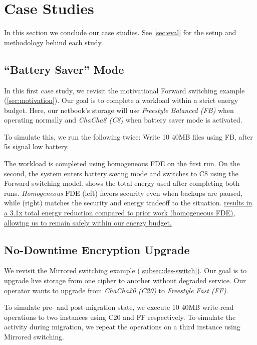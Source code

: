 \section{Case Studies}\label{sec:usecases}

In this section we conclude our case studies. See \cref{sec:eval} for the setup
and methodology behind each study.


\subsection{``Battery Saver'' Mode}\label{subsec:usecase-battery}

In this first case study, we revisit the motivational Forward switching example
(\cref{sec:motivation}). Our goal is to complete a workload within a strict
energy budget. Here, our netbook's storage will use {\em Freestyle Balanced
(FB)} when operating normally and {\em ChaCha8 (C8)} when battery saver mode is
activated.



To simulate this, we run the following twice: Write 10 40MB files using FB,
after 5s signal low battery.

The workload is completed using homogeneous FDE on the first run. On the second,
the system enters battery saving mode and \sys switches to C8 using the Forward
switching model.   shows the total energy used after
completing both runs. {\em Homogeneous} FDE (left) favors security even when
backups are paused, while \sys (right) matches the security and energy tradeoff
to the situation. \uline{\sys results in a 3.1x total energy reduction compared
to prior work (homogeneous FDE), allowing us to remain safely within our energy
budget.}


\subsection{No-Downtime Encryption Upgrade}\label{subsec:usecase-upgrade}

We revisit the Mirrored switching example (\cref{subsec:des-switch}). Our goal
is to upgrade live storage from one cipher to another without degraded service.
Our operator wants to upgrade from {\em ChaCha20 (C20)} to {\em Freestyle Fast
(FF)}.

To simulate pre- and post-migration state, we execute 10 40MB write-read
operations to two \sys instances using C20 and FF respectively. To simulate the
activity during migration, we repeat the operations on a third instance using
Mirrored switching.

